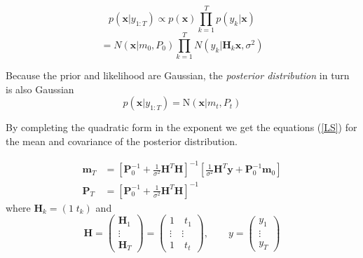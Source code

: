 $$ p(\mathbf{x} | y_{1:T})  \propto p(\mathbf{x}) \prod^T_{k=1} p (y_k | \mathbf{x}) $$
$$ = N(\mathbf{x} | m_0, P_0) \prod^T_{k=1} N(y_k | \textbf{H}_k \mathbf{x}, \sigma^2) $$

Because the prior and likelihood are Gaussian, the \textit{posterior distribution}
in turn is also Gaussian
$$ p(\mathbf{x} | y_{1:T}) = \text{N}(\mathbf{x} | m_t, P_t) $$

By completing the quadratic form in the exponent
we get the equations (\ref{LS}) for the mean and covariance
of the posterior distribution.

\begin{equation}
  \label{LS}
  \begin{aligned}
    \mathbf{m}_T &= \left[ \mathbf{P}^{-1}_0 + \frac{1}{\sigma^2} \mathbf{H}^T \mathbf{H}
                   \right]^{-1} \left[\frac{1}{\sigma^2} \mathbf{H}^T \mathbf{y} +
                   \mathbf{P}^{-1}_0 \mathbf{m}_0 \right] \\
    \mathbf{P}_T &= \left[\mathbf{P}_0^{-1} + \frac{1}{\sigma^2} \mathbf{H}^T \mathbf{H}
                 \right]^{-1}
  \end{aligned}
\end{equation}
where $\mathbf{H}_k = (1 \;t_k)$ and
$$ \mathbf{H} =
\begin{pmatrix} \mathbf{H}_1 \\ \vdots \\ \mathbf{H}_T \end{pmatrix}
= \begin{pmatrix}
  1 \quad t_1 \\
  \vdots \quad \vdots \\
  1 \quad t_t
\end{pmatrix},
\quad \quad y = \begin{pmatrix} y_1 \\ \vdots \\ y_T \end{pmatrix}
$$


